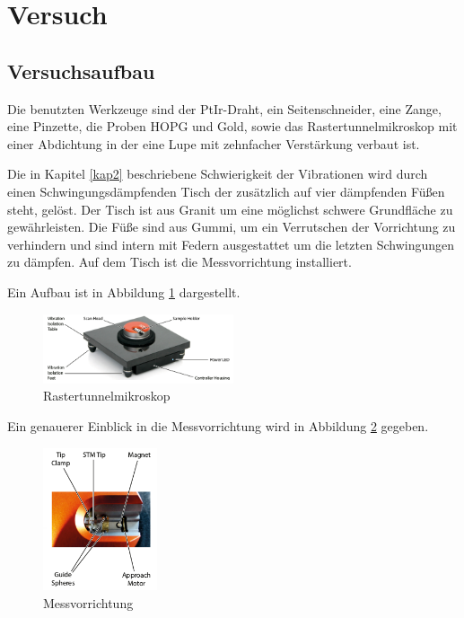 \section{Versuch}
\subsection{Versuchsaufbau}
Die benutzten Werkzeuge sind der PtIr-Draht, ein Seitenschneider, eine Zange, eine Pinzette, die Proben HOPG und Gold, sowie das Rastertunnelmikroskop mit einer Abdichtung in der eine Lupe mit zehnfacher Verstärkung verbaut ist.

\noindent Die in Kapitel \ref{kap2} beschriebene Schwierigkeit der Vibrationen wird durch einen Schwingungsdämpfenden Tisch der zusätzlich auf vier dämpfenden Füßen steht, gelöst. Der Tisch ist aus Granit um eine möglichst schwere Grundfläche zu gewährleisten. Die Füße sind aus Gummi, um ein Verrutschen der Vorrichtung zu verhindern und sind intern mit Federn ausgestattet um die letzten Schwingungen zu dämpfen. Auf dem Tisch ist die Messvorrichtung installiert.

\noindent Ein Aufbau ist in Abbildung \ref{fig:Aufbau1} \cite{handbuch} dargestellt. 

\begin{figure}
	\centering
		\includegraphics[width=0.5\textwidth]{Aufbau1.png}
	\caption{Rastertunnelmikroskop}
	\label{fig:Aufbau1}
\end{figure}

\noindent Ein genauerer Einblick in die Messvorrichtung wird in Abbildung \ref{fig:Aufbau2} gegeben.

\begin{figure}
	\centering
		\includegraphics[width=0.3\textwidth]{Aufbau2.png}
	\caption{Messvorrichtung}
	\label{fig:Aufbau2}
\end{figure}

